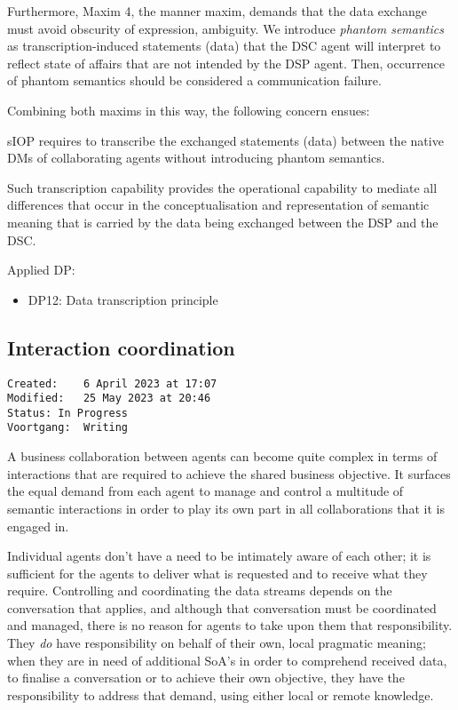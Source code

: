 \documentclass[sort&compress,preprint,3p,authoryear,twocolumn]{elsarticle}
\providecommand{\tightlist}{%
  \setlength{\itemsep}{0pt}\setlength{\parskip}{0pt}}
\theoremstyle{break}			%
\begin{document}
Furthermore, Maxim 4, the manner maxim, demands that the data exchange
must avoid obscurity of expression, ambiguity. We introduce
\emph{phantom semantics} as transcription-induced statements (data) that
the DSC agent will interpret to reflect state of affairs that are not
intended by the DSP agent. Then, occurrence of phantom semantics should
be considered a communication failure.

Combining both maxims in this way, the following concern ensues:

\begin{mmconcern}\label{cncrn:dtc}
    sIOP requires to transcribe the exchanged statements (data) between the native DMs of collaborating agents without introducing phantom semantics. 
\end{mmconcern}

Such transcription capability provides the operational capability to
mediate all differences that occur in the conceptualisation and
representation of semantic meaning that is carried by the data being
exchanged between the DSP and the DSC.

Applied DP:

\begin{itemize}
\tightlist
\item
  DP12: Data transcription principle
\end{itemize}

\subsection{Interaction coordination}\label{interaction-coordination}

\begin{verbatim}
Created:    6 April 2023 at 17:07
Modified:   25 May 2023 at 20:46
Status: In Progress
Voortgang:  Writing
\end{verbatim}

A business collaboration between agents can become quite complex in
terms of interactions that are required to achieve the shared business
objective. It surfaces the equal demand from each agent to manage and
control a multitude of semantic interactions in order to play its own
part in all collaborations that it is engaged in.

Individual agents don't have a need to be intimately aware of each
other; it is sufficient for the agents to deliver what is requested and
to receive what they require. Controlling and coordinating the data
streams depends on the conversation that applies, and although that
conversation must be coordinated and managed, there is no reason for
agents to take upon them that responsibility. They \emph{do} have
responsibility on behalf of their own, local pragmatic meaning; when
they are in need of additional SoA's in order to comprehend received
data, to finalise a conversation or to achieve their own objective, they
have the responsibility to address that demand, using either local or
remote knowledge.
\end{document}
